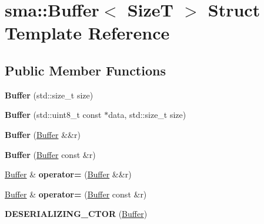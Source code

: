\hypertarget{structsma_1_1Buffer}{\section{sma\-:\-:Buffer$<$ Size\-T $>$ Struct Template Reference}
\label{structsma_1_1Buffer}
}
\subsection*{Public Member Functions}
\begin{DoxyCompactItemize}
\item 
\hypertarget{structsma_1_1Buffer_af75359b4a2a5b623c49a8eef50b72a1c}{{\bfseries Buffer} (std\-::size\-\_\-t size)}\label{structsma_1_1Buffer_af75359b4a2a5b623c49a8eef50b72a1c}

\item 
\hypertarget{structsma_1_1Buffer_a903f2dffc014914f612413b44365abfc}{{\bfseries Buffer} (std\-::uint8\-\_\-t const $\ast$data, std\-::size\-\_\-t size)}\label{structsma_1_1Buffer_a903f2dffc014914f612413b44365abfc}

\item 
\hypertarget{structsma_1_1Buffer_a410c9d6e0cee0465555f83a98b71a4cc}{{\bfseries Buffer} (\hyperlink{structsma_1_1Buffer}{Buffer} \&\&r)}\label{structsma_1_1Buffer_a410c9d6e0cee0465555f83a98b71a4cc}

\item 
\hypertarget{structsma_1_1Buffer_a915a33d5bb6396c0126dd3ec0e0f52ab}{{\bfseries Buffer} (\hyperlink{structsma_1_1Buffer}{Buffer} const \&r)}\label{structsma_1_1Buffer_a915a33d5bb6396c0126dd3ec0e0f52ab}

\item 
\hypertarget{structsma_1_1Buffer_aa6728160064fe204e8bb72fd512c514a}{\hyperlink{structsma_1_1Buffer}{Buffer} \& {\bfseries operator=} (\hyperlink{structsma_1_1Buffer}{Buffer} \&\&r)}\label{structsma_1_1Buffer_aa6728160064fe204e8bb72fd512c514a}

\item 
\hypertarget{structsma_1_1Buffer_ad00607f52dd911003503cd3b5e240958}{\hyperlink{structsma_1_1Buffer}{Buffer} \& {\bfseries operator=} (\hyperlink{structsma_1_1Buffer}{Buffer} const \&r)}\label{structsma_1_1Buffer_ad00607f52dd911003503cd3b5e240958}

\item 
\hypertarget{structsma_1_1Buffer_aae691e017440ca0902ea13896eb62140}{{\bfseries D\-E\-S\-E\-R\-I\-A\-L\-I\-Z\-I\-N\-G\-\_\-\-C\-T\-O\-R} (\hyperlink{structsma_1_1Buffer}{Buffer})}\label{structsma_1_1Buffer_aae691e017440ca0902ea13896eb62140}


\end{DoxyCompactItemize}

